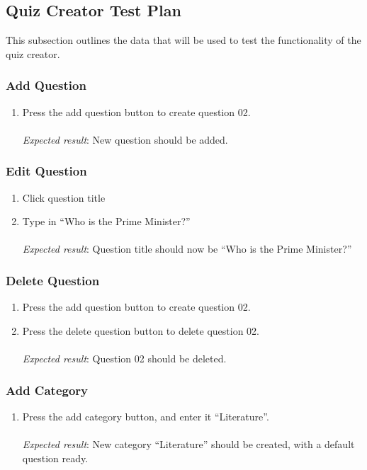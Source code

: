 \subsection{Quiz Creator Test Plan}
This subsection outlines the data that will be used to test the functionality of the quiz creator.

\subsubsection{Add Question}
\begin{enumerate}[leftmargin=*]
\item Press the add question button to create question 02.\\\\
\textit{Expected result}: New question should be added.
\end{enumerate}

\subsubsection{Edit Question}
\begin{enumerate}[leftmargin=*]
\item Click question title
\item Type in ``Who is the Prime Minister?''\\\\
\textit{Expected result}: Question title should now be ``Who is the Prime Minister?''
\end{enumerate}

\subsubsection{Delete Question}
\begin{enumerate}[leftmargin=*]
\item Press the add question button to create question 02.
\item Press the delete question button to delete question 02.\\\\
\textit{Expected result}: Question 02 should be deleted.
\end{enumerate}

\subsubsection{Add Category}
\begin{enumerate}[leftmargin=*]
\item Press the add category button, and enter it ``Literature''.\\\\
\textit{Expected result}: New category ``Literature'' should be created, with a default question ready.
\end{enumerate}

